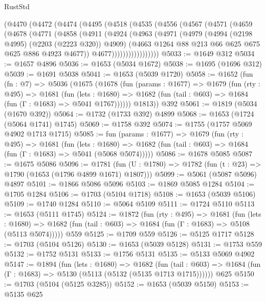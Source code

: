 \begin{lexlean}{RustStd}
\begin{coremodule}
    (@4470
      (@4472
        (@4474
          (@4495
            (@4518
              (@4535
                (@4556
                  (@4567
                    (@4571
                      (@4659
                        (@4678
                          (@4771
                            (@4858
                              (@4911
                                (@4924
                                  (@4963
                                    (@4971
                                      (@4979
                                        (@4994 (@2198 @4995) (@2203 (@2223 @320)) @4909)
                                        (@4663 @1264 @88 @213 @66 @625 @675 @625 @886 @4923 @4677))
                                      @4677)))))))))))))))))
@5033 := @1649 @312
@5034 := @1657 @4896
@5036 := @1653 (@5034 @1672)
@5038 := @1695 (@1696 @312)
@5039 := @1691 @5038
@5041 := @1653 (@5039 @1720)
@5058 := @1652
    (fun (fn : @7) =>
    @5036
      (@1675
        (@1678
          (fun (params : @1677) =>
          @1679
            (fun (rty : @495) =>
            @1681
              (fun (lets : @1680) =>
              @1682 (fun (tail : @603) => @1684 (fun (Γ : @1683) => @5041 @1767))))))
        @1813))
    @392
@5061 := @1819 (@5034 (@1670 @392))
@5064 := @1732 (@1733 @392) @4899
@5068 := @1653 (@1724 (@5064 @1741) @1745)
@5069 := @1758 @392
@5074 := @1755 (@1757 @5069 @4902 @1713 @1715)
@5085 := fun (params : @1677) =>
  @1679
    (fun (rty : @495) =>
    @1681
      (fun (lets : @1680) =>
      @1682 (fun (tail : @603) => @1684 (fun (Γ : @1683) => @5041 (@5068 @5074)))))
@5086 := @1678 @5085
@5087 := @1675 @5086
@5096 := @1781 (fun (U : @1780) => @1782 (fun (t : @23) => @1790 (@1653 (@1796 @4899 @1671) @1807)))
@5099 := @5061 (@5087 @5096) @4897
@5101 := @1866 @5086 @5096
@5103 := @1869 @5085 @1284
@5104 := @1705 @1284
@5106 := @1703 (@5104 @1718)
@5108 := @1653 (@5039 @5106)
@5109 := @1740 @1284
@5110 := @5064 @5109
@5111 := @1724 @5110
@5113 := @1653 (@5111 @1745)
@5124 := @1872
    (fun (rty : @495) =>
    @1681
      (fun (lets : @1680) =>
      @1682 (fun (tail : @603) => @1684 (fun (Γ : @1683) => @5108 (@5113 @5074)))))
    @559
@5125 := @1709 @559
@5126 := @5125 @1717
@5128 := @1703 (@5104 @5126)
@5130 := @1653 (@5039 @5128)
@5131 := @1753 @559
@5132 := @1752 @5131
@5133 := @1756 @5131
@5135 := @5133 @5069 @4902
@5147 := @1894
    (fun (lets : @1680) =>
    @1682
      (fun (tail : @603) => @1684 (fun (Γ : @1683) => @5130 (@5113 (@5132 (@5135 @1713 @1715))))))
    @625
@5150 := @1703 (@5104 (@5125 @3285))
@5152 := @1653 (@5039 @5150)
@5153 := @5135 @625

\end{coremodule}
\end{lexlean}
